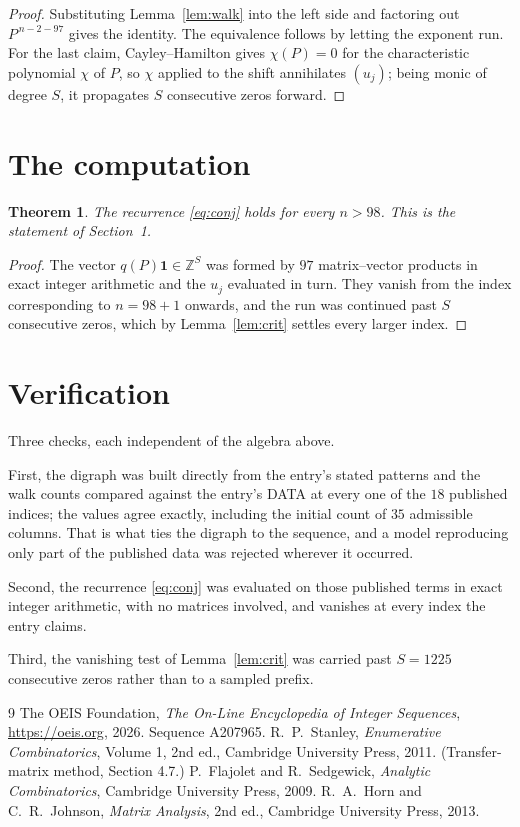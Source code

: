\documentclass[11pt,a4paper]{article}
\theoremstyle{plain}
\newtheorem{theorem}{Theorem}
\theoremstyle{definition}
\begin{document}
\begin{proof}
Substituting Lemma~\ref{lem:walk} into the left side and factoring out
$P^{\,n-2-97}$ gives the identity. The equivalence follows by letting the exponent
run. For the last claim, Cayley--Hamilton gives $\chi(P)=0$ for the characteristic
polynomial $\chi$ of $P$, so $\chi$ applied to the shift annihilates $(u_j)$; being monic of
degree $S$, it propagates $S$ consecutive zeros forward.
\end{proof}

\section{The computation}

\begin{theorem}
The recurrence \eqref{eq:conj} holds for every $n>98$. This is the statement of
Section~1.
\end{theorem}

\begin{proof}
The vector $q(P)\mathbf{1}\in\mathbb{Z}^{S}$ was formed by $97$ matrix--vector
products in exact integer arithmetic and the $u_j$ evaluated in turn. They vanish from the
index corresponding to $n=98+1$ onwards, and the run was continued past $S$ consecutive
zeros, which by Lemma~\ref{lem:crit} settles every larger index.
\end{proof}

\section{Verification}

Three checks, each independent of the algebra above.

First, the digraph was built directly from the entry's stated patterns and the walk counts
compared against the entry's DATA at every one of the $18$ published indices; the
values agree exactly, including the initial count of $35$ admissible columns. That is
what ties the digraph to the sequence, and a model reproducing only part of the published
data was rejected wherever it occurred.

Second, the recurrence \eqref{eq:conj} was evaluated on those published terms in exact
integer arithmetic, with no matrices involved, and vanishes at every index the entry claims.

Third, the vanishing test of Lemma~\ref{lem:crit} was carried past $S=1225$ consecutive
zeros rather than to a sampled prefix.

\begin{thebibliography}{9}
 The OEIS Foundation, \emph{The On-Line Encyclopedia of Integer
Sequences}, \url{https://oeis.org}, 2026. Sequence A207965.
 R.~P.~Stanley, \emph{Enumerative Combinatorics}, Volume 1, 2nd ed.,
Cambridge University Press, 2011. (Transfer-matrix method, Section 4.7.)
 P.~Flajolet and R.~Sedgewick, \emph{Analytic Combinatorics}, Cambridge
University Press, 2009.
 R.~A.~Horn and C.~R.~Johnson, \emph{Matrix Analysis}, 2nd ed., Cambridge
University Press, 2013.
\end{thebibliography}
\end{document}
